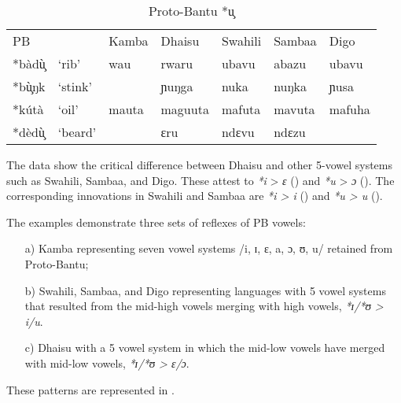 \documentclass[output=paper,colorlinks,citecolor=brown]{langscibook}
\begin{document}
\begin{table}
    \caption{Proto-Bantu *u̧}
    \label{tab:ngonyani:12}
    \begin{tabular}{@{}p{1cm} p{1.3cm} p{1.3cm} p{1.3cm} p{1.3cm} p{1.3cm} p{1.3cm}@{}}
        PB & & Kamba & Dhaisu & Swahili & Sambaa & Digo \\
        *bàdù̧  & `rib' & wau & rwaru  & ubavu & abazu & ubavu \\
        *bù̧ŋk & `stink' &  & ɲuŋga & nuka & nuŋka & ɲusa\\
        *kútà & `oil' & mauta & maguuta & mafuta & mavuta & mafuha\\
        *dèdù̧ & `beard' &  & ɛru & ndɛvu & ndɛzu & \\
    \end{tabular}
\end{table}

The data show the critical difference between Dhaisu and other 5-vowel systems such as Swahili, Sambaa, and Digo. These attest to \textit{*i} > \textit{ɛ} () and  \textit{*u} >  \textit{ɔ} (). The corresponding innovations in Swahili and Sambaa are \textit{*i > i} () and \textit{*u > u} ().

The examples demonstrate three sets of reflexes of PB vowels:

\begin{enumerate}
    \item[a)] Kamba representing seven vowel systems /i, ɪ, ɛ, a, ɔ, ʊ, u/ retained from Proto-Bantu; 
    \item[b)] Swahili, Sambaa, and Digo representing languages with 5 vowel systems that resulted from the mid-high vowels merging with high vowels,  \textit{ *ɪ/*ʊ >  i/u}.
    \item[c)] Dhaisu with a 5 vowel system in which the mid-low vowels have merged with mid-low vowels, \textit{*ɪ/*ʊ > ɛ/ɔ}.
\end{enumerate}

\noindent These patterns are represented in .
\end{document}
